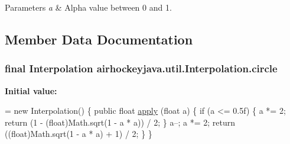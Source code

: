 \begin{DoxyParams}{Parameters}
{\em a} & Alpha value between 0 and 1. \\
\hline
\end{DoxyParams}


\subsection{Member Data Documentation}
\hypertarget{classairhockeyjava_1_1util_1_1_interpolation_a3cc544c57f785204f5ef048040a3ff7a}{}
\subsubsection[{circle}]{\setlength{\rightskip}{0pt plus 5cm}final {\bf Interpolation} airhockeyjava.\+util.\+Interpolation.\+circle\hspace{0.3cm}{\ttfamily [static]}}\label{classairhockeyjava_1_1util_1_1_interpolation_a3cc544c57f785204f5ef048040a3ff7a}
{\bfseries Initial value\+:}
\begin{DoxyCode}
= \textcolor{keyword}{new} Interpolation() \{
        \textcolor{keyword}{public} \textcolor{keywordtype}{float} \hyperlink{classairhockeyjava_1_1util_1_1_interpolation_a21c50444fd69302dcf68703cb0d261ca}{apply} (\textcolor{keywordtype}{float} a) \{
            \textcolor{keywordflow}{if} (a <= 0.5f) \{
                a *= 2;
                \textcolor{keywordflow}{return} (1 - (\textcolor{keywordtype}{float})Math.sqrt(1 - a * a)) / 2;
            \}
            a--;
            a *= 2;
            \textcolor{keywordflow}{return} ((\textcolor{keywordtype}{float})Math.sqrt(1 - a * a) + 1) / 2;
        \}
    \}
\end{DoxyCode}
\hypertarget{classairhockeyjava_1_1util_1_1_interpolation_a1d8bbdc5615fbaad9c447f81f8eb0fbd}{}
